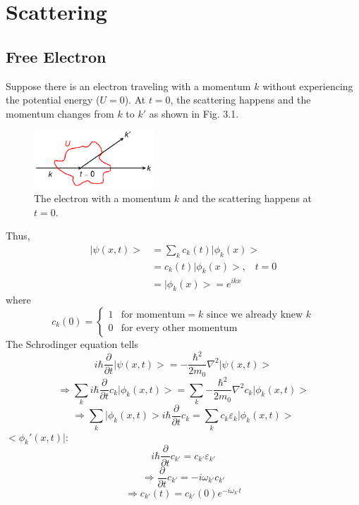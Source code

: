 \chapter{Scattering}
\section{Free Electron}
Suppose there is an electron traveling with a momentum $k$ without experiencing the potential energy ($U=0$). At $t=0$, the scattering happens and the momentum changes from $k$ to $k'$ as shown in Fig. 3.1.
\begin{figure}[tbp]
\includegraphics[width=0.4\textwidth]{figures/Fig3_1}
\centering
\caption{\small The electron with a momentum $k$ and the scattering happens at $t = 0$.}
\end{figure}
Thus, \begin{align}
    \big|\psi(x,t)\big>& = \sum_{k}{c_{k}(t)}\big|\phi_{k}(x)\big>\nonumber\\
    & = c_{k}(t)\big|\phi_{k}(x)\big>\text{,}\quad\text{$t=0$}\nonumber\\
    & = \big|\phi_{k}(x)\big> = e^{ikx}
\end{align} where \begin{equation}
    c_{k}(0)=
    \begin{cases}
    1 & \text{for momentum$=k$ since we already knew $k$}\\
    0 & \text{for every other momentum}
    \end{cases}
\end{equation} The Schrodinger equation tells \begin{equation}
    i\hbar\frac{\partial}{\partial t}\big|\psi(x,t)\big> = -\frac{\hbar^{2}}{2m_{0}}\nabla^{2}\big|\psi(x,t)\big>\nonumber
\end{equation} \begin{equation}
    \Rightarrow\sum_{k}{i\hbar\frac{\partial}{\partial t}c_{k}\big|\phi_{k}(x,t)\big>} = \sum_{k}{-\frac{\hbar^{2}}{2m_{0}}\nabla^{2}c_{k}\big|\phi_{k}(x,t)\big>}\nonumber
\end{equation} \begin{equation}
    \Rightarrow\sum_{k}{\big|\phi_{k}(x,t)\big>i\hbar\frac{\partial}{\partial t}c_{k}} = \sum_{k}{c_{k}\varepsilon_{k}\big|\phi_{k}(x,t)\big>}
\end{equation} $\big<\phi_{k}'(x,t)\big|$: \begin{equation}
    i\hbar\frac{\partial}{\partial t}c_{k'} = c_{k'}\varepsilon_{k'}\nonumber
\end{equation} \begin{equation}
    \Rightarrow\frac{\partial}{\partial t}c_{k'} = -i\omega_{k'}c_{k'}\nonumber
\end{equation} \begin{equation}
    \Rightarrow\boxed{c_{k'}(t) = c_{k'}(0)e^{-i\omega_{k'}t}}
\end{equation}
